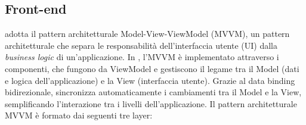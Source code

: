 \subsection{Front-end}
\label{subsec:architettura_frontend}
 adotta il pattern architetturale Model-View-ViewModel (MVVM), un pattern architetturale che separa le responsabilità dell'interfaccia utente (UI) dalla \textit{business logic} di un'applicazione.
In , l'MVVM è implementato attraverso i componenti, che fungono da ViewModel e gestiscono il legame tra il Model (dati e logica dell'applicazione) e la View (interfaccia utente).
Grazie al data binding bidirezionale,  sincronizza automaticamente i cambiamenti tra il Model e la View, semplificando l'interazione tra i livelli dell'applicazione.
Il pattern architetturale MVVM è formato dai seguenti tre layer:
